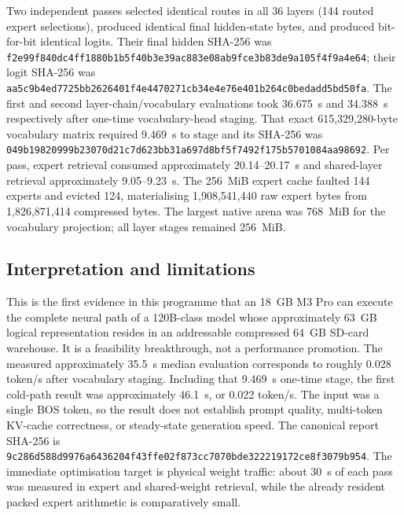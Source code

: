 Two independent passes selected identical routes in all 36 layers (144 routed
expert selections), produced identical final hidden-state bytes, and produced
bit-for-bit identical logits.  Their final hidden SHA-256 was
\texttt{f2e99f840dc4ff1880b1b5f40b3e39ac883e08ab9fce3b83de9a105f4f9a4e64};
their logit SHA-256 was
\texttt{aa5c9b4ed7725bb2626401f4e4470271cb34e4e76e401b264c0bedadd5bd50fa}.
The first and second layer-chain/vocabulary evaluations took 36.675~s and
34.388~s respectively after one-time vocabulary-head staging.  That exact
615,329,280-byte vocabulary matrix required 9.469~s to stage and its SHA-256 was
\texttt{049b19820999b23070d21c7d623bb31a697d8bf5f7492f175b5701084aa98692}.
Per pass, expert retrieval consumed approximately 20.14--20.17~s and
shared-layer retrieval approximately 9.05--9.23~s.  The 256~MiB expert cache faulted 144 experts and
evicted 124, materialising 1,908,541,440 raw expert bytes from 1,826,871,414
compressed bytes.  The largest native arena was 768~MiB for the vocabulary
projection; all layer stages remained 256~MiB.

\subsection{Interpretation and limitations}
This is the first evidence in this programme that an 18~GB M3 Pro can execute
the complete neural path of a 120B-class model whose approximately 63~GB logical
representation resides in an addressable compressed 64~GB SD-card warehouse.
It is a feasibility breakthrough, not a performance promotion.  The measured
approximately 35.5~s median evaluation corresponds to roughly 0.028 token/s
after vocabulary staging.  Including that 9.469~s one-time stage, the first
cold-path result was approximately 46.1~s, or 0.022 token/s.  The input
was a single BOS token, so the result does not establish prompt quality,
multi-token KV-cache correctness, or steady-state generation speed.  The
canonical report SHA-256 is
\texttt{9c286d588d9976a6436204f43ffe02f873cc7070bde322219172ce8f3079b954}.
The immediate
optimisation target is physical weight traffic: about 30~s of each pass was
measured in expert and shared-weight retrieval, while the already resident
packed expert arithmetic is comparatively small.


